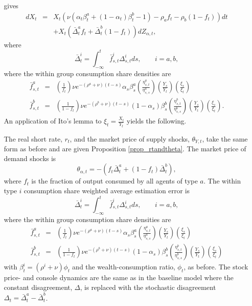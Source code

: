 gives
\begin{eqnarray}
	dX_t &=& X_t\left( \nu\left(\alpha_t \beta^a_t + \left(1-\alpha_t\right)\beta^b_t - 1\right)  - \rho_a f_t - \rho_b \left(1-f_t\right)\right) dt  \nonumber \\
	&&+ X_t\left(\bar{\Delta}^{a}_t f_t + \bar{\Delta}^b_t \left(1-f_t\right)\right)dZ_{\alpha,t},
\end{eqnarray}
where 
\begin{equation}
	\bar{\Delta}^i_t = \int_{-\infty}^{t} \bar{f}^i_{s,t} \Delta^i_{s,t}ds,  \qquad i=a,b,
\end{equation}
where  the within group consumption share densities are
\begin{eqnarray}
	\bar{f}^a_{s,t} &=&\left(\frac{1}{f_t}\right)\nu e^{-\left(\rho^a+\nu\right)\left(t-s\right)} \alpha_s \beta^a_{s}\left(\frac{\eta^a_{s,t}}{\eta^a_{s,s}}\right)\left(\frac{Y_s}{Y_t}\right)\left(\frac{\xi_s}{\xi_t}\right)\\
	\bar{f}^b_{s,t} &=& \left(\frac{1}{1-f_t}\right)\nu e^{-\left(\rho^b+\nu\right)\left(t-s\right)} \left(1-\alpha_s\right) \beta^b_{s}\left(\frac{\eta^b_{s,t}}{\eta^b_{s,s}}\right)\left(\frac{Y_s}{Y_t}\right)\left(\frac{\xi_s}{\xi_t}\right).
\end{eqnarray}
An application of Ito's lemma to $\xi_t = \frac{X_t}{Y_t}$ yields the following. 

\begin{prop}\label{SDFgeneralDIS}
The real short rate, $r_t$, and the market price of supply shocks, $\theta_{Y,t}$, take the same form as before and are given Proposition \ref{prop_rtandtheta}. The market price of demand shocks is 
\begin{equation}
\theta_{\alpha,t} %
= -\left(f_t \bar{\Delta}^a_t + \left(1-f_t\right)\bar{\Delta}^b_t\right), 
\end{equation}
where $f_t$ is the fraction of output consumed by all agents of type $a$. The within type $i$ consumption share weighted average estimation error is 
\begin{equation}
	\bar{\Delta}^i_t = \int_{-\infty}^{t} \bar{f}^i_{s,t} \Delta^i_{s,t}ds,  \qquad i=a,b,
\end{equation}
where  the within group consumption share densities are
\begin{eqnarray}
	\bar{f}^a_{s,t} &=&\left(\frac{1}{f_t}\right)\nu e^{-\left(\rho^a+\nu\right)\left(t-s\right)} \alpha_s \beta^a_{s}\left(\frac{\eta^a_{s,t}}{\eta^a_{s,s}}\right)\left(\frac{Y_s}{Y_t}\right)\left(\frac{\xi_s}{\xi_t}\right)\\
	\bar{f}^b_{s,t} &=& \left(\frac{1}{1-f_t}\right)\nu e^{-\left(\rho^b+\nu\right)\left(t-s\right)} \left(1-\alpha_s\right) \beta^b_{s}\left(\frac{\eta^b_{s,t}}{\eta^b_{s,s}}\right)\left(\frac{Y_s}{Y_t}\right)\left(\frac{\xi_s}{\xi_t}\right)
\end{eqnarray}
with $\beta^i_t = \left(\rho^i + \nu\right)\phi_t$ and the wealth-consumption ratio, $\phi_t$, as before. The stock price- and console dynamics are the same as in the baseline model where the constant disagreement, $\Delta$, is replaced with the stochastic disagreement $\Delta_t= \bar{\Delta}^a_t - \bar{\Delta}^b_t$. 
\end{prop}

